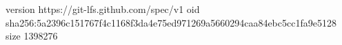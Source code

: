version https://git-lfs.github.com/spec/v1
oid sha256:5a2396c151767f4c1168f3da4e75ed971269a5660294caa84ebc5cc1fa9e5128
size 1398276

